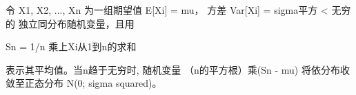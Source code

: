\documentclass{article}
\begin{document}

\begin{CJK*}{UTF8}{gbsn}

令 X1, X2, ..., Xn 为一组期望值 E[Xi] = mu，
方差 Var[Xi] = sigma平方 < 无穷的
独立同分布随机变量，且用

Sn = 1/n 乘上Xi从1到n的求和

表示其平均值。当n趋于无穷时, 
随机变量 （n的平方根）乘(Sn - mu) 
将依分布收敛至正态分布 
N(0; sigma squared)。

\clearpage\end{CJK*}
\end{document}
